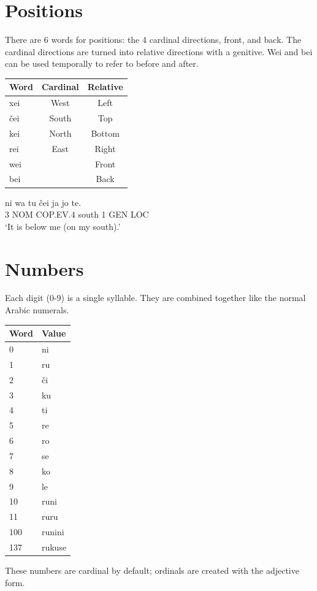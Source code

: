 \documentclass{clgrammar}
\begin{document}
\chapter{Positions}

There are 6 words for positions: the 4 cardinal directions, front, and back. The cardinal directions are turned into relative directions with a genitive. Wei and bei can be used temporally to refer to before and after.

\begin{center}
	\begin{tabular}{l|c|c}
		Word & Cardinal & Relative \\ 
		\hline 
		xei  & West     & Left     \\
		čei  & South    & Top \\
		kei  & North    & Bottom \\
		rei  & East     & Right \\
		wei  &          & Front \\
		bei  &          & Back \\
	\end{tabular}
\end{center}

\begin{exe}
	\ex
	\gll ni wa tu čei ja jo te. \\
	3 NOM COP.EV.4 south 1 GEN LOC\\
	\trans `It is below me (on my south).'
\end{exe}

\chapter{Numbers}
Each digit (0-9) is a single syllable. They are combined together like the normal Arabic numerals.
\begin{center}
	\begin{tabular}{l|l}
		Word & Value \\
		\hline
		0 & ni \\
		1 & ru \\
		2 & či \\
		3 & ku \\
		4 & ti \\
		5 & re \\
		6 & ro \\
		7 & se \\
		8 & ko \\
		9 & le \\
		10 & runi \\
		11 & ruru \\
		100 & runini \\
		137 & rukuse \\
	\end{tabular}
\end{center}
These numbers are cardinal by default; ordinals are created with the adjective form.
\end{document}
